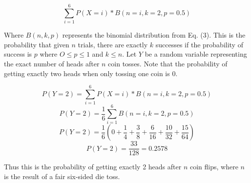 \documentclass[11pt]{article}
\begin{document}
$$\sum_{i = 1}^6 P(X=i) * B(n = i, k = 2, p = 0.5)$$

Where $B(n, k, p)$ represents the binomial distribution from Eq. (3). This is the probability that given $n$ trials, there are exactly $k$ successes if the probability of success is $p$ where $O \leq p \leq 1$ and $k \leq n$. Let $Y$ be a random variable representing the exact number of heads after $n$ coin tosses. Note that the probability of getting exactly two heads when only tossing one coin is 0.

$$P(Y = 2) = \sum_{i = 1}^6 P(X=i) * B(n = i, k = 2, p = 0.5)$$
$$P(Y = 2) = \frac{1}{6}\sum_{i = 1}^6 B(n = i, k = 2, p = 0.5)$$
$$P(Y = 2) = \frac{1}{6}(0 + \frac{1}{4} + \frac{3}{8} + \frac{6}{16} + \frac{10}{32} + \frac{15}{64})$$
$$P(Y = 2) = \frac{33}{128} = 0.2578$$

Thus this is the probability of getting exactly 2 heads after $n$ coin flips, where $n$ is the result of a fair six-sided die toss.

\end{document}
